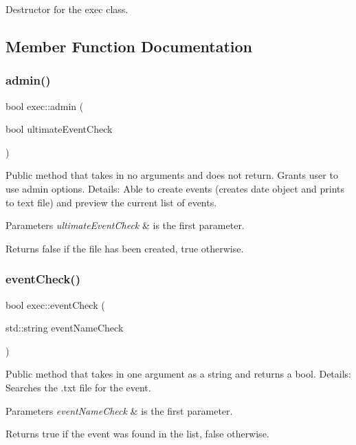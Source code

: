 Destructor for the exec class. 

\subsection{Member Function Documentation}
\mbox{\label{classexec_ab114315e1bb0daff8f96dc03e7c88392}} 
\subsubsection{\texorpdfstring{admin()}{admin()}}
{\footnotesize\ttfamily bool exec\+::admin (\begin{DoxyParamCaption}\item[{bool}]{ultimate\+Event\+Check }\end{DoxyParamCaption})}

Public method that takes in no arguments and does not return. Grants user to use admin options. Details\+: Able to create events (creates date object and prints to text file) and preview the current list of events. 
\begin{DoxyParams}{Parameters}
{\em ultimate\+Event\+Check} & is the first parameter. \\
\hline
\end{DoxyParams}
\begin{DoxyReturn}{Returns}
false if the file has been created, true otherwise. 
\end{DoxyReturn}
\mbox{\label{classexec_abf1c735a300deae3f5de4bf6891f2190}} 
\subsubsection{\texorpdfstring{event\+Check()}{eventCheck()}}
{\footnotesize\ttfamily bool exec\+::event\+Check (\begin{DoxyParamCaption}\item[{std\+::string}]{event\+Name\+Check }\end{DoxyParamCaption})}

Public method that takes in one argument as a string and returns a bool. Details\+: Searches the .txt file for the event. 
\begin{DoxyParams}{Parameters}
{\em event\+Name\+Check} & is the first parameter. \\
\hline
\end{DoxyParams}
\begin{DoxyReturn}{Returns}
true if the event was found in the list, false otherwise. 
\end{DoxyReturn}
\mbox{\label{classexec_a24a4ca6c8f63a73ed38ddc8e9d015c46}} 
